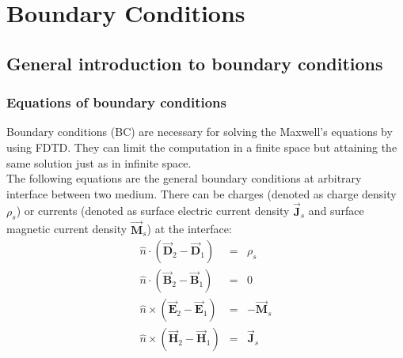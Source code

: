 \section{Boundary Conditions}\label{sec:BC}
    \subsection{General introduction to boundary conditions}\label{subsec:General introduction to BC}
    \subsubsection{Equations of boundary conditions}\label{subsubsec:Equations of BC}
	  Boundary conditions (BC) are necessary for solving the  Maxwell's equations by using FDTD. They can limit the computation in a finite space but attaining the same solution just as in  infinite space.  \\
	  The following equations are the general boundary conditions at  arbitrary interface between two medium. There can be  charges (denoted as charge density $\rho_s$) or  currents (denoted as surface electric current density $\vec{\mathbf{J}}_s$ and  surface magnetic current density $\vec{\mathbf{M}}_s$) at the interface:
	      \begin{eqnarray}
		  \hat{n}\cdot(\vec{\mathbf{D}}_2-\vec{\mathbf{D}}_1) &=&\rho_s  \\
		  \hat{n}\cdot(\vec{\mathbf{B}}_2-\vec{\mathbf{B}}_1) &=&0  \\
		  \hat{n}\times(\vec{\mathbf{E}}_2-\vec{\mathbf{E}}_1) &=&-\vec{\mathbf{M}}_s \\
		  \hat{n}\times(\vec{\mathbf{H}}_2-\vec{\mathbf{H}}_1) &=&\vec{\mathbf{J}}_s
		  \label{eq:General boundary conditions}
	      \end{eqnarray}

